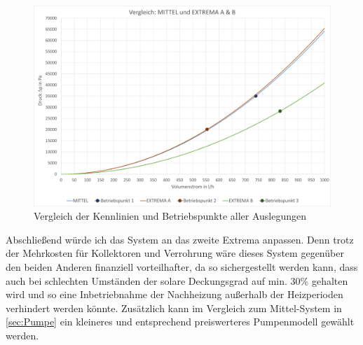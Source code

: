 \begin{figure}[H]
    \centering
    \includegraphics[width=\textwidth]{Abbildungen/Kennlinie-Vergleich.png}
    \caption{Vergleich der Kennlinien und Betriebspunkte aller Auslegungen}
    \label{Vergleich}
\end{figure}

Abschließend würde ich das System an das zweite Extrema anpassen.
Denn trotz der Mehrkosten für Kollektoren und Verrohrung wäre dieses System gegenüber den beiden
Anderen finanziell vorteilhafter, da so sichergestellt werden kann, dass auch bei schlechten Umständen der
solare Deckungsgrad auf min. 30\% gehalten wird und so eine Inbetriebnahme der Nachheizung außerhalb
der Heizperioden verhindert werden könnte. Zusätzlich kann im Vergleich zum Mittel-System in \autoref{sec:Pumpe}
ein kleineres und entsprechend preiswerteres Pumpenmodell gewählt werden.
